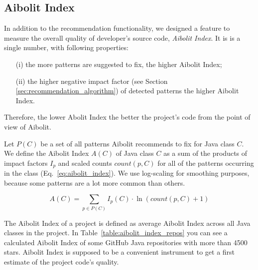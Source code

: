 \subsection{Aibolit Index}

In addition to the recommendation functionality, we designed a feature to measure the overall quality of developer's source code, \textit{Aibolit Index}.
It is is a single number, with following properties: 
\begin{itemize}
\item[(i)] the more patterns are suggested to fix, the higher Aibolit Index;
\item[(ii)] the higher negative impact factor (see Section \ref{sec:recommendation_algorithm}) 
of detected patterns the higher Aibolit Index.
\end{itemize}
Therefore, the lower Abolit Index the better the project's code from the point 
of view of Aibolit.

Let $P(C)$ be a set of all patterns Aibolit recommends to fix for Java class $C$.
We define the Aibolit Index $A(C)$ of Java class $C$ as a sum of the products of
impact factors $I_{p}$ and scaled counts $count(p, C)$ for all of the 
patterns occurring in the class (Eq.~\ref{eq:aibolit_index}). We use log-scaling for smoothing purposes, because some patterns are a lot more common than others.    


\begin{equation}
    A(C) = \sum_{p \in P(C)} { I_{p}(C) \cdot \ln{(count(p, C) + 1)} } \label{eq:aibolit_index}
\end{equation}


The Aibolit Index of a project is defined as average Aibolit Index
across all Java classes in the project. In Table~\ref{table:aibolit_index_repos} 
you can see a calculated Aibolit Index of some GitHub Java repositories with 
more than 4500 stars. Aibolit Index is supposed to be a convenient instrument
to get a first estimate of the project code's quality. 

